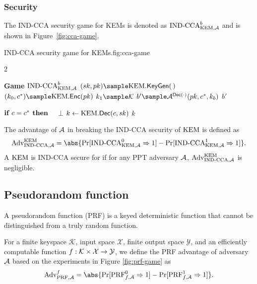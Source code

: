 \subsubsection{Security}
%
The IND-CCA security game for KEMs is denoted as $\text{IND-CCA}^b_{\text{KEM},
    \mathcal{A}}$ and is shown in Figure~\ref{fig:cca-game}.
%
\begin{gamefigure}{IND-CCA security game for KEMs.}{fig:cca-game}
    \begin{games}{2}
        \begin{gameenv}{\textbf{Game} $\text{IND-CCA}^b_{\text{KEM}, \mathcal{A}}$}
            \State $(\sk, \pk) \sample \kem.\keygen(\,)$
            \State $(k_0, c^*) \sample \kem.\enc(\pk)$
            \State $k_1 \sample \mathcal{K}$
            \State $b' \sample \adversary{A}^{\mathsf{Dec(\cdot)}}(\pk, c^*, k_b)$
            \State \Return $b'$
        \end{gameenv}
        \gamebreak
        \begin{gameenv}{\oracledec}
            \State $\textbf{if } c = c^* \textbf{ then}$
                \State $\quad $\Return $\bot$
                \State $k \gets \text{KEM}.\textsf{Dec}(c, sk)$
                \State \Return $k$
            \end{gameenv}
        \end{games}
    \end{gamefigure}


    \begin{definition}
        The advantage of $\mathcal{A}$ in breaking the IND-CCA security of
        $\text{KEM}$ is defined as
        \[
            \advantage{\cca, \adversary{A}}{\kem} = \abs{\prone{\cca^0_{\kem, \adversary{A}}} - \prone{\cca^1_{\kem, \adversary{A}}}}.
        \]
        A $\text{KEM}$ is IND-CCA secure for if for any PPT adversary
        $\mathcal{A}$, $\text{Adv}_{\text{IND-CCA}, \mathcal{A}}^{\text{KEM}}$ is
        negligible.
    \end{definition}

    \subsection{Pseudorandom function}\label{sec:prf}
    A pseudorandom function (PRF) is a keyed deterministic function that cannot be distinguished from a truly random function.

    \begin{definition}
        \label{def:prf}
        For a finite keyspace $\mathcal{K}$, input space $\mathcal{X}$,
        finite output space $\mathcal{Y}$, and an efficiently computable
        function $f: \mathcal{K} \times \mathcal{X} \rightarrow \mathcal{Y}$, we
        define the PRF advantage of adversary $\mathcal{A}$ based on the
        experiments in Figure \ref{fig:prf-game} as
        \[
            \advantage{\prf, \adversary{A}}{f} = \abs{\prone{\prf^0_{f, \adversary{A}}} - \prone{\prf^1_{f, \adversary{A}}}}.
        \]
    \end{definition}

